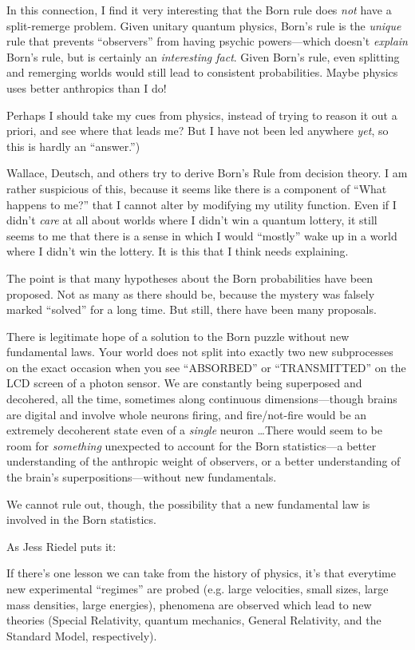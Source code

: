 {
 In this connection, I find it very interesting that the Born rule
does \textit{not} have a split-remerge problem. Given unitary quantum
physics, Born's rule is the \textit{unique} rule that
prevents ``observers'' from having
psychic powers---which doesn't \textit{explain}
Born's rule, but is certainly an \textit{interesting
fact}. Given Born's rule, even splitting and remerging
worlds would still lead to consistent probabilities. Maybe physics uses
better anthropics than I do!}

{
 Perhaps I should take my cues from physics, instead of trying to
reason it out a priori, and see where that leads me? But I have not
been led anywhere \textit{yet}, so this is hardly an
``answer.'')}

{
 Wallace, Deutsch, and others try to derive Born's
Rule from decision theory. I am rather suspicious of this, because it
seems like there is a component of ``What happens to
me?'' that I cannot alter by modifying my utility
function. Even if I didn't \textit{care} at all about
worlds where I didn't win a quantum lottery, it still
seems to me that there is a sense in which I would
``mostly'' wake up in a world where
I didn't win the lottery. It is this that I think needs
explaining.}

{
 The point is that many hypotheses about the Born probabilities
have been proposed. Not as many as there should be, because the mystery
was falsely marked ``solved'' for a
long time. But still, there have been many proposals.}

{
 There is legitimate hope of a solution to the Born puzzle without
new fundamental laws. Your world does not split into exactly two new
subprocesses on the exact occasion when you see
``ABSORBED'' or
``TRANSMITTED'' on the LCD screen of
a photon sensor. We are constantly being superposed and decohered, all
the time, sometimes along continuous dimensions---though brains are
digital and involve whole neurons firing, and fire/not-fire would be an
extremely decoherent state even of a \textit{single} neuron \ldots There
would seem to be room for \textit{something} unexpected to account for
the Born statistics---a better understanding of the anthropic weight of
observers, or a better understanding of the brain's
superpositions---without new fundamentals.}

{
 We cannot rule out, though, the possibility that a new fundamental
law is involved in the Born statistics.}

{
 As Jess Riedel puts it:}

{
 If there's one lesson we can take from the history
of physics, it's that everytime new experimental
``regimes'' are probed (e.g. large
velocities, small sizes, large mass densities, large energies),
phenomena are observed which lead to new theories (Special Relativity,
quantum mechanics, General Relativity, and the Standard Model,
respectively).}

